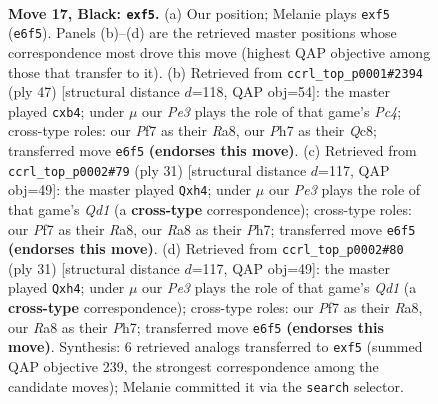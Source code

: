\documentclass[11pt]{article}
\begin{document}
\clearpage

\begin{figure}[p]\centering
\begin{subfigure}{0.46\textwidth}\centering
\resizebox{\linewidth}{!}{%
\newchessgame
\chessboard[
  setfen={rnbqnrk1/1p3ppp/4p3/p1b1PP1P/P1PN1R2/6P1/6B1/RNBQ2K1 b - - 2 17},
  showmover=false,
  pgfstyle=straightmove, color=movearrow, markmove={e6-f5}
]}
\caption{}
\end{subfigure}\hfill
\begin{subfigure}{0.46\textwidth}\centering
\resizebox{\linewidth}{!}{%
\newchessgame
\chessboard[
  setfen={r1qnrbk1/5pp1/p6p/Ppp1p2b/1P2P3/1BP2NPP/4QPK1/R1BR4 b - - 1 24},
  showmover=false,
  pgfstyle=straightmove, color=movearrow, markmove={c5-b4}
]}
\caption{}
\end{subfigure}
\\[4pt]
\begin{subfigure}{0.46\textwidth}\centering
\resizebox{\linewidth}{!}{%
\newchessgame
\chessboard[
  setfen={r2q1rk1/1p3ppp/1p1p4/pP2p2b/P3P1nN/1BPP3P/5P2/R1BQ1RK1 b - - 0 16},
  showmover=false,
  pgfstyle=straightmove, color=movearrow, markmove={d8-h4}
]}
\caption{}
\end{subfigure}\hfill
\begin{subfigure}{0.46\textwidth}\centering
\resizebox{\linewidth}{!}{%
\newchessgame
\chessboard[
  setfen={r2q1rk1/1p3ppp/1p1p4/pP2p2b/P3P1nN/1BPP3P/5P2/R1BQ1RK1 b - - 0 16},
  showmover=false,
  pgfstyle=straightmove, color=movearrow, markmove={d8-h4}
]}
\caption{}
\end{subfigure}
\caption{\textbf{Move 17, Black: \texttt{exf5}.} (a) Our position; Melanie plays \texttt{exf5} (\texttt{e6f5}). Panels (b)--(d) are the retrieved master positions whose correspondence most drove this move (highest QAP objective among those that transfer to it). (b) Retrieved from \texttt{ccrl\_top\_p0001\#2394} (ply 47) [structural distance $d$=118, QAP obj=54]: the master played \texttt{cxb4}; under $\mu$ our \emph{Pe3} plays the role of that game's \emph{Pc4}; cross-type roles: our \emph{P}f7 as their \emph{R}a8, our \emph{P}h7 as their \emph{Q}c8; transferred move \texttt{e6f5} \textbf{(endorses this move)}. (c) Retrieved from \texttt{ccrl\_top\_p0002\#79} (ply 31) [structural distance $d$=117, QAP obj=49]: the master played \texttt{Qxh4}; under $\mu$ our \emph{Pe3} plays the role of that game's \emph{Qd1} (a \textbf{cross-type} correspondence); cross-type roles: our \emph{P}f7 as their \emph{R}a8, our \emph{R}a8 as their \emph{P}h7; transferred move \texttt{e6f5} \textbf{(endorses this move)}. (d) Retrieved from \texttt{ccrl\_top\_p0002\#80} (ply 31) [structural distance $d$=117, QAP obj=49]: the master played \texttt{Qxh4}; under $\mu$ our \emph{Pe3} plays the role of that game's \emph{Qd1} (a \textbf{cross-type} correspondence); cross-type roles: our \emph{P}f7 as their \emph{R}a8, our \emph{R}a8 as their \emph{P}h7; transferred move \texttt{e6f5} \textbf{(endorses this move)}. Synthesis: 6 retrieved analogs transferred to \texttt{exf5} (summed QAP objective 239, the strongest correspondence among the candidate moves); Melanie committed it via the \texttt{search} selector.}
\label{fig:thought-m33}
\end{figure}
\end{document}
